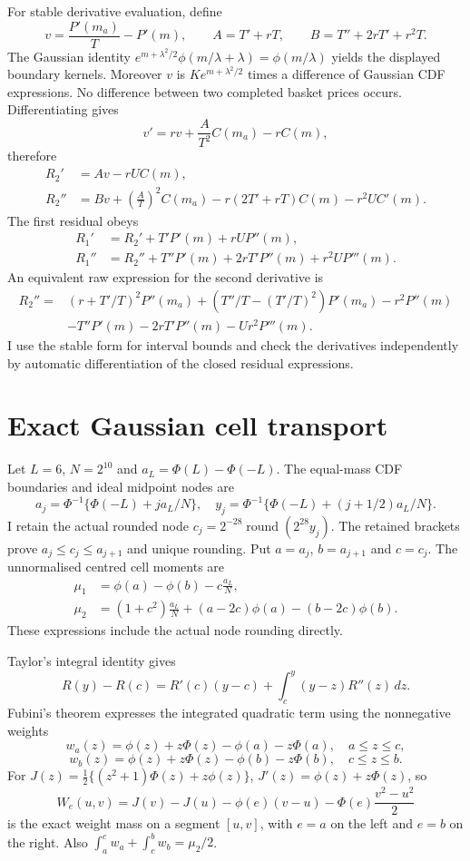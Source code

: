 \documentclass[11pt]{article}
\begin{document}
For stable derivative evaluation, define
\[
 v=\frac{P'(m_a)}{T}-P'(m),\qquad A=T'+rT,\qquad
 B=T''+2rT'+r^2T.
\]
The Gaussian identity $e^{m+\lambda^2/2}\phi(m/\lambda+\lambda)=\phi(m/\lambda)$ yields the displayed boundary kernels. Moreover $v$ is $K e^{m+\lambda^2/2}$ times a difference of Gaussian CDF expressions. No difference between two completed basket prices occurs. Differentiating gives
\[
 v'=rv+\frac A{T^2}C(m_a)-rC(m),
\]
therefore
\begin{align*}
 R_2'&=Av-rUC(m),\\
 R_2''&=Bv+\left(\frac A T\right)^2C(m_a)
       -r(2T'+rT)C(m)-r^2UC'(m).
\end{align*}
The first residual obeys
\begin{align*}
 R_1'&=R_2'+T'P'(m)+rUP''(m),\\
 R_1''&=R_2''+T''P'(m)+2rT'P''(m)+r^2UP'''(m).
\end{align*}
An equivalent raw expression for the second derivative is
\begin{align*}
R_2''={}&(r+T'/T)^2P''(m_a)
 +(T''/T-(T'/T)^2)P'(m_a)-r^2P''(m)\\
 &-T''P'(m)-2rT'P''(m)-Ur^2P'''(m).
\end{align*}
I use the stable form for interval bounds and check the derivatives independently by automatic differentiation of the closed residual expressions.

\section{Exact Gaussian cell transport}
Let $L=6$, $N=2^{10}$ and $a_L=\Phi(L)-\Phi(-L)$. The equal-mass CDF boundaries and ideal midpoint nodes are
\[
 a_j=\Phi^{-1}\{\Phi(-L)+j a_L/N\},\quad
 y_j=\Phi^{-1}\{\Phi(-L)+(j+1/2)a_L/N\}.
\]
I retain the actual rounded node $c_j=2^{-28}\operatorname{round}(2^{28}y_j)$. The retained brackets prove $a_j\leq c_j\leq a_{j+1}$ and unique rounding. Put $a=a_j$, $b=a_{j+1}$ and $c=c_j$. The unnormalised centred cell moments are
\begin{align*}
 \mu_1&=\phi(a)-\phi(b)-c\frac{a_L}{N},\\
 \mu_2&=(1+c^2)\frac{a_L}{N}
       +(a-2c)\phi(a)-(b-2c)\phi(b).
\end{align*}
These expressions include the actual node rounding directly.

Taylor's integral identity gives
\[
 R(y)-R(c)=R'(c)(y-c)+\int_c^y(y-z)R''(z)\,dz.
\]
Fubini's theorem expresses the integrated quadratic term using the nonnegative weights
\[
 w_a(z)=\phi(z)+z\Phi(z)-\phi(a)-z\Phi(a),\quad a\leq z\leq c,
\]
\[
 w_b(z)=\phi(z)+z\Phi(z)-\phi(b)-z\Phi(b),\quad c\leq z\leq b.
\]
For $J(z)=\tfrac12\{(z^2+1)\Phi(z)+z\phi(z)\}$, $J'(z)=\phi(z)+z\Phi(z)$, so
\[
 W_e(u,v)=J(v)-J(u)-\phi(e)(v-u)-\Phi(e)\frac{v^2-u^2}{2}
\]
is the exact weight mass on a segment $[u,v]$, with $e=a$ on the left and $e=b$ on the right. Also $\int_a^c w_a+\int_c^b w_b=\mu_2/2$.
\end{document}
